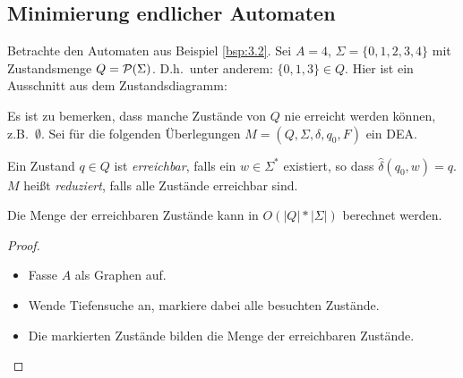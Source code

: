 \subsection{Minimierung endlicher Automaten}

Betrachte den Automaten aus Beispiel \ref{bsp:3.2}.
Sei $A =4$, $\Sigma = \{0, 1, 2, 3, 4\}$ mit Zustandsmenge $Q = \mathcal{P}(\Sigma)$.
D.h.\ unter anderem: $\{0, 1, 3\} \in Q$.
Hier ist ein Ausschnitt aus dem Zustandsdiagramm:

\begin{center}
\end{center}
Es ist zu bemerken, dass manche Zustände von $Q$ nie erreicht werden können, z.B.\ $\emptyset$.
Sei für die folgenden Überlegungen $M = (Q, \Sigma, \delta, q_0, F)$ ein DEA.

\begin{Def}
  Ein Zustand $q \in Q$ ist \emph{erreichbar}, falls ein $w \in \Sigma^*$ existiert, so dass $\hat \delta(q_0, w) = q$.
  $M$ heißt \emph{reduziert}, falls alle Zustände erreichbar sind.
\end{Def}
\begin{Satz}
  Die Menge der erreichbaren Zustände kann in $O(|Q|*|\Sigma|)$ berechnet werden.
\end{Satz}
\begin{proof}~\\
  \vspace{-\baselineskip}
  \begin{itemize}
  \item Fasse $A$ als Graphen auf.
  \item Wende Tiefensuche an, markiere dabei alle besuchten Zustände.
  \item Die markierten Zustände bilden die Menge der erreichbaren Zustände.
  \end{itemize}
\end{proof}

